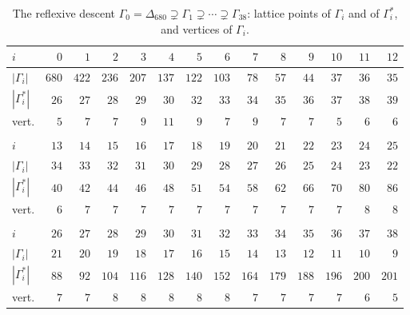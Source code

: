 \documentclass[11pt]{amsart}
\theoremstyle{definition}
\theoremstyle{remark}
\newcommand{\Dbig}{\Delta_{680}}
\begin{document}
\begin{table}[t]
\caption{The reflexive descent $\Gamma_0=\Dbig\supsetneq\Gamma_1\supsetneq
\cdots\supsetneq\Gamma_{38}$: lattice points of $\Gamma_i$ and of
$\Gamma_i^*$, and vertices of $\Gamma_i$.}\label{tab:chain}
\centering
\begin{tabular}{lrrrrrrrrrrrrr}
\toprule
$i$ & $0$ & $1$ & $2$ & $3$ & $4$ & $5$ & $6$ & $7$ & $8$ & $9$ & $10$ & $11$ & $12$\\
\midrule
$|\Gamma_i|$ & $680$ & $422$ & $236$ & $207$ & $137$ & $122$ & $103$ & $78$ & $57$ & $44$ & $37$ & $36$ & $35$\\
$|\Gamma_i^*|$ & $26$ & $27$ & $28$ & $29$ & $30$ & $32$ & $33$ & $34$ & $35$ & $36$ & $37$ & $38$ & $39$\\
vert. & $5$ & $7$ & $7$ & $9$ & $11$ & $9$ & $7$ & $9$ & $7$ & $7$ & $5$ & $6$ & $6$\\
 &  &  &  &  &  &  &  &  &  &  &  &  & \\
$i$ & $13$ & $14$ & $15$ & $16$ & $17$ & $18$ & $19$ & $20$ & $21$ & $22$ & $23$ & $24$ & $25$\\
$|\Gamma_i|$ & $34$ & $33$ & $32$ & $31$ & $30$ & $29$ & $28$ & $27$ & $26$ & $25$ & $24$ & $23$ & $22$\\
$|\Gamma_i^*|$ & $40$ & $42$ & $44$ & $46$ & $48$ & $51$ & $54$ & $58$ & $62$ & $66$ & $70$ & $80$ & $86$\\
vert. & $6$ & $7$ & $7$ & $7$ & $7$ & $7$ & $7$ & $7$ & $7$ & $7$ & $7$ & $8$ & $8$\\
 &  &  &  &  &  &  &  &  &  &  &  &  & \\
$i$ & $26$ & $27$ & $28$ & $29$ & $30$ & $31$ & $32$ & $33$ & $34$ & $35$ & $36$ & $37$ & $38$\\
$|\Gamma_i|$ & $21$ & $20$ & $19$ & $18$ & $17$ & $16$ & $15$ & $14$ & $13$ & $12$ & $11$ & $10$ & $9$\\
$|\Gamma_i^*|$ & $88$ & $92$ & $104$ & $116$ & $128$ & $140$ & $152$ & $164$ & $179$ & $188$ & $196$ & $200$ & $201$\\
vert. & $7$ & $7$ & $8$ & $8$ & $8$ & $8$ & $8$ & $7$ & $7$ & $7$ & $7$ & $6$ & $5$\\
\bottomrule
\end{tabular}
\end{table}
\end{document}
